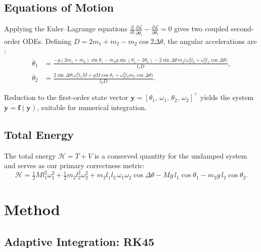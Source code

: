 \documentclass[11pt,a4paper]{article}
\newcommand{\dd}{\mathrm{d}}
\newcommand{\Lagr}{\mathcal{L}}
\newcommand{\Ham}{\mathcal{H}}
\newcommand{\vect}[1]{\boldsymbol{#1}}
\begin{document}
\subsection{Equations of Motion}

Applying the Euler--Lagrange equations $\frac{\dd}{\dd t}\frac{\partial\Lagr}{\partial\dot\theta_i} - \frac{\partial\Lagr}{\partial\theta_i} = 0$ gives two coupled second-order ODEs. Defining $D = 2m_1 + m_2 - m_2\cos 2\Delta\theta$, the angular accelerations are \citep{wikipedia_double_pendulum}:
\begin{align}
  \ddot\theta_1 &= \frac{-g(2m_1{+}m_2)\sin\theta_1
    - m_2 g\sin(\theta_1{-}2\theta_2)
    - 2\sin\Delta\theta\,m_2\bigl(\omega_2^2 l_2 + \omega_1^2 l_1\cos\Delta\theta\bigr)}{l_1 D},
  \label{eq:ddtheta1}\\[6pt]
  \ddot\theta_2 &= \frac{2\sin\Delta\theta\bigl(\omega_1^2 l_1 M
    + gM\cos\theta_1
    + \omega_2^2 l_2 m_2\cos\Delta\theta\bigr)}{l_2 D}.
  \label{eq:ddtheta2}
\end{align}

Reduction to the first-order state vector
$\vect{y} = [\theta_1,\,\omega_1,\,\theta_2,\,\omega_2]^\top$ yields
the system $\dot{\vect{y}} = \vect{f}(\vect{y})$, suitable for numerical
integration.

\subsection{Total Energy}

The total energy $\Ham = T + V$ is a conserved quantity for the undamped system and serves as our primary correctness metric:
\begin{equation}
  \Ham = \tfrac{1}{2}M l_1^2\omega_1^2
       + \tfrac{1}{2}m_2 l_2^2\omega_2^2
       + m_2 l_1 l_2\,\omega_1\omega_2\cos\Delta\theta
       - Mg\,l_1\cos\theta_1
       - m_2 g\,l_2\cos\theta_2.
  \label{eq:energy}
\end{equation}

\section{Method}\label{sec:method}

\subsection{Adaptive Integration: RK45}
\end{document}
